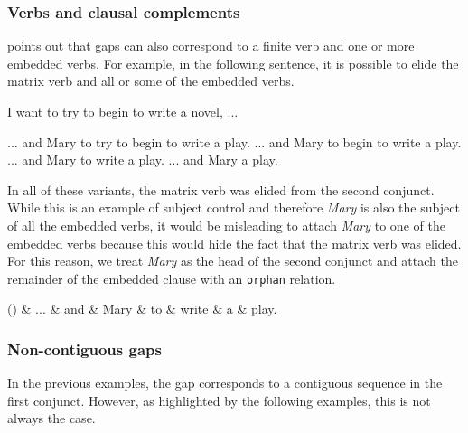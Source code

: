 \documentclass[lucida,biblatex]{sp} %
\newcounter{excounter}
\begin{document}
\subsubsection{Verbs and clausal complements}

\citet{Ross1970} points out that gaps can also correspond to a finite
verb and one or more embedded verbs. For example, in the following 
sentence, it is possible to elide the matrix verb and all or some of the embedded verbs. 
\begin{exe}
  \setcounter{xnumi}{\value{excounter}}
  \ex \label{ex:non-fin-embedded}
  I want to try to begin to write a novel, ...
  \begin{xlist}
    \ex ... and Mary to try to begin to write a play.
    \ex ... and Mary to begin to write a play.
    \ex ... and Mary to write a play.
    \ex ... and Mary a play. \hfill \citep{Ross1970}
  \end{xlist}
\end{exe}
In all of these variants, the matrix verb was elided from the second conjunct. 
While this is an example of subject control and therefore \textit{Mary} is also the 
subject of all the embedded verbs, it would be misleading to attach \textit{Mary} to 
one of the embedded verbs because this would hide the fact that the matrix verb 
was elided. For this reason, we treat \textit{Mary} as the head of the second conjunct 
and attach the remainder of the embedded clause with an \texttt{orphan} relation.

\begin{center}
  \label{ex:en-gap-5}
  \footnotesize
  \begin{dependency}[edge unit distance=2.5ex]
    \begin{deptext}[column sep=0.3cm]
      (\theexcounter)
      \& ... \& and \& Mary \& to \& write \& a \& play. \\
    \end{deptext}
  \end{dependency}
\end{center}

\subsubsection{Non-contiguous gaps}

In the previous examples, the gap corresponds to a contiguous sequence in 
the first conjunct. However, as highlighted by the following examples, this is 
not always the case.
\end{document}
